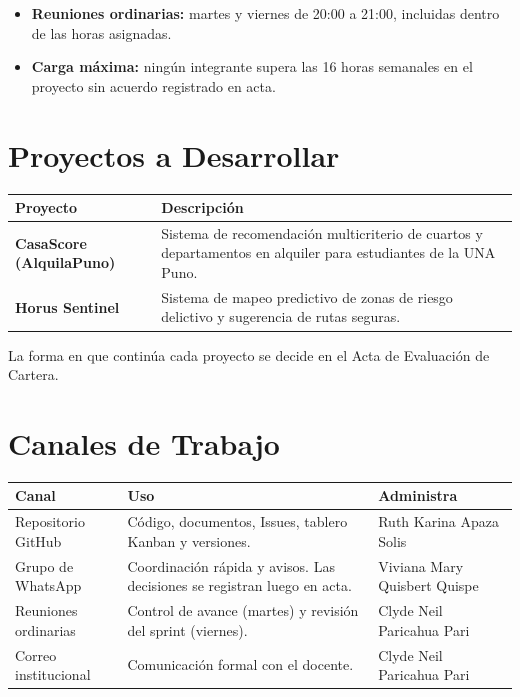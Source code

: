 \documentclass[11pt,a4paper]{article}
\begin{document}
\vspace{0.1cm}
\begin{itemize}[leftmargin=*]
    \item \textbf{Reuniones ordinarias:} martes y viernes de 20:00 a 21:00, incluidas dentro de las horas asignadas.
    \item \textbf{Carga máxima:} ningún integrante supera las 16 horas semanales en el proyecto sin acuerdo registrado en acta.
\end{itemize}

\section{Proyectos a Desarrollar}
{\small
\noindent\begin{tabularx}{\textwidth}{@{}P{3.2cm} L@{}}
\toprule
{}
\textbf{Proyecto} & \textbf{Descripción} \\
\midrule
\textbf{CasaScore (AlquilaPuno)} & Sistema de recomendación multicriterio de cuartos y departamentos en alquiler para estudiantes de la UNA Puno. \\
\textbf{Horus Sentinel} & Sistema de mapeo predictivo de zonas de riesgo delictivo y sugerencia de rutas seguras. \\
\bottomrule
\end{tabularx}
}

\vspace{0.1cm}
\noindent La forma en que continúa cada proyecto se decide en el Acta de Evaluación de Cartera.

\section{Canales de Trabajo}
{\small
\noindent\begin{tabularx}{\textwidth}{@{}P{3.6cm} L P{3.0cm}@{}}
\toprule
{}
\textbf{Canal} & \textbf{Uso} & \textbf{Administra} \\
\midrule
Repositorio GitHub & Código, documentos, Issues, tablero Kanban y versiones. & Ruth Karina Apaza Solis \\
Grupo de WhatsApp & Coordinación rápida y avisos. Las decisiones se registran luego en acta. & Viviana Mary Quisbert Quispe \\
Reuniones ordinarias & Control de avance (martes) y revisión del sprint (viernes). & Clyde Neil Paricahua Pari \\
Correo institucional & Comunicación formal con el docente. & Clyde Neil Paricahua Pari \\
\bottomrule
\end{tabularx}
}
\end{document}
